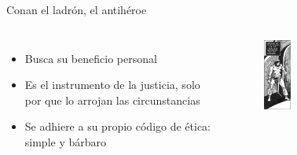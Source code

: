 \begin{frame}{Conan el ladrón, el antihéroe}
\begin{columns}
 \begin{itemize}
   \item Busca su beneficio personal
   \item Es el instrumento de la justicia, solo por que lo arrojan las circunstancias
   \item Se adhiere a su propio código de ética: simple y bárbaro
 \end{itemize}
 \begin{figure}[htb]
    \centering
    \includegraphics[width=0.25\textwidth]{img/tropes/antiheroe}
 \end{figure} 
 \end{columns}
\end{frame}

